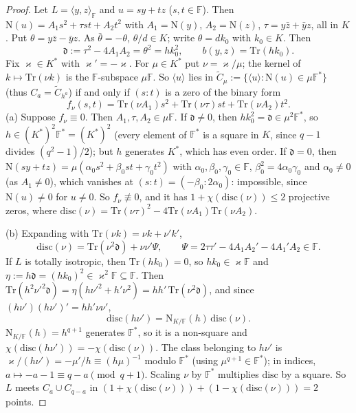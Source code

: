 \documentclass[11pt]{amsart}
\theoremstyle{definition}
\theoremstyle{remark}
\numberwithin{equation}{section}
\newcommand{\F}{\mathbb F}
\newcommand{\Tr}{\mathrm{Tr}}
\newcommand{\Nm}{\mathrm{N}}
\begin{document}
\begin{proof}
Let $L=\langle y,z\rangle_\F$ and $u=sy+tz$ ($s,t\in\F$). Then $\Nm(u)=A_1s^2+\tau st+A_2t^2$ with $A_1=\Nm(y)$,
$A_2=\Nm(z)$, $\tau=y\bar z+\bar yz$, all in $K$. Put $\theta=y\bar z-\bar yz$. As $\bar\theta=-\theta$, $\theta/d\in K$; write
$\theta=dk_0$ with $k_0\in K$. Then
\[
\mathfrak d:=\tau^2-4A_1A_2=\theta^2=hk_0^2,\qquad b(y,z)=\Tr(hk_0).
\]
Fix $\varkappa\in K^*$ with $\varkappa'=-\varkappa$. For $\mu\in K^*$ put $\nu=\varkappa/\mu$; the kernel of
$k\mapsto\Tr(\nu k)$ is the $\F$-subspace $\mu\F$. So $\langle u\rangle$ lies in
$\widetilde C_\mu:=\{\langle u\rangle:\Nm(u)\in\mu\F^*\}$ (thus $C_a=\widetilde C_{h^a}$) if and only if $(s:t)$ is a zero of
the binary form
\[
f_\nu(s,t)=\Tr(\nu A_1)s^2+\Tr(\nu\tau)st+\Tr(\nu A_2)t^2 .
\]
(a) Suppose $f_\nu\equiv0$. Then $A_1,\tau,A_2\in\mu\F$. If $\mathfrak d\ne0$, then $hk_0^2=\mathfrak d\in\mu^2\F^*$, so
$h\in(K^*)^2\F^*=(K^*)^2$ (every element of $\F^*$ is a square in $K$, since $q-1$ divides $(q^2-1)/2$); but $h$ generates
$K^*$, which has even order. If $\mathfrak d=0$, then $\Nm(sy+tz)=\mu(\alpha_0s^2+\beta_0st+\gamma_0t^2)$ with
$\alpha_0,\beta_0,\gamma_0\in\F$, $\beta_0^2=4\alpha_0\gamma_0$ and $\alpha_0\ne0$ (as $A_1\ne0$), which vanishes at
$(s:t)=(-\beta_0:2\alpha_0)$: impossible, since $\Nm(u)\ne0$ for $u\ne0$. So $f_\nu\not\equiv0$, and it has
$1+\chi(\mathrm{disc}(\nu))\le2$ projective zeros, where
$\mathrm{disc}(\nu)=\Tr(\nu\tau)^2-4\Tr(\nu A_1)\Tr(\nu A_2)$.

(b) Expanding with $\Tr(\nu k)=\nu k+\nu'k'$,
\[
\mathrm{disc}(\nu)=\Tr(\nu^2\mathfrak d)+\nu\nu'\Psi,\qquad \Psi=2\tau\tau'-4A_1A_2'-4A_1'A_2\in\F .
\]
If $L$ is totally isotropic, then $\Tr(hk_0)=0$, so $hk_0\in\varkappa\F$ and $\eta:=h\mathfrak d=(hk_0)^2\in\varkappa^2\F\subseteq\F$.
Then $\Tr(h^2\nu'^2\mathfrak d)=\eta(h\nu'^2+h'\nu^2)=hh'\,\Tr(\nu^2\mathfrak d)$, and since $(h\nu')(h\nu')'=hh'\nu\nu'$,
\[
\mathrm{disc}(h\nu')=\Nm_{K/\F}(h)\,\mathrm{disc}(\nu).
\]
$\Nm_{K/\F}(h)=h^{q+1}$ generates $\F^*$, so it is a non-square and $\chi(\mathrm{disc}(h\nu'))=-\chi(\mathrm{disc}(\nu))$. The
class belonging to $h\nu'$ is $\varkappa/(h\nu')=-\mu'/h\equiv(h\mu)^{-1}$ modulo $\F^*$ (using $\mu^{q+1}\in\F^*$); in
indices, $a\mapsto-a-1\equiv q-a\pmod{q+1}$. Scaling $\nu$ by $\F^*$ multiplies $\mathrm{disc}$ by a square. So $L$ meets
$C_a\cup C_{q-a}$ in $(1+\chi(\mathrm{disc}(\nu)))+(1-\chi(\mathrm{disc}(\nu)))=2$ points.
\end{proof}
\end{document}
